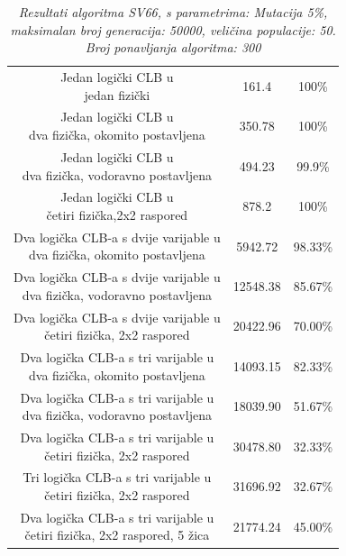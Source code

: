 \documentclass[times, utf8, zavrsni]{fer}
\begin{document}
		
		\begin{table}[htb]
			\caption{\emph{Rezultati algoritma SV66, s parametrima: Mutacija 5\%, maksimalan broj generacija: 50000, veličina populacije: 50. Broj ponavljanja algoritma: 300}}
			\label{gen-alg}
			\centering
			\begin{tabular}{|c | c | c|} \hline
				\thead{Opis} & \thead{Vrijeme u generacijama} & \thead{Uspješnost} \\ \hline
				\makecell{Jedan logički CLB u \\ jedan fizički } & 161.4 & 100\% \\ \hline
				\makecell{Jedan logički CLB u \\ dva fizička, okomito postavljena} & 350.78 & 100\% \\ \hline
				\makecell{Jedan logički CLB u \\ dva fizička, vodoravno postavljena} & 494.23 & 99.9\% \\ \hline
				\makecell{Jedan logički CLB u \\ četiri fizička,2x2 raspored} & 878.2 & 100\% \\ \hline
				\makecell{Dva logička CLB-a s dvije varijable u \\ dva fizička, okomito postavljena} & 5942.72 & 98.33\% \\ \hline
				\makecell{Dva logička CLB-a s dvije varijable u \\ dva fizička, vodoravno postavljena} & 12548.38 & 85.67\% \\ \hline
				\makecell{Dva logička CLB-a s dvije varijable u \\ četiri fizička, 2x2 raspored} & 20422.96 & 70.00\% \\ \hline
				\makecell{Dva logička CLB-a s tri varijable u \\ dva fizička, okomito postavljena} & 14093.15 & 82.33\% \\ \hline
				\makecell{Dva logička CLB-a s tri varijable u \\ dva fizička, vodoravno postavljena} & 18039.90 & 51.67\% \\ \hline
				\makecell{Dva logička CLB-a s tri varijable u \\ četiri fizička, 2x2 raspored} & 30478.80 & 32.33\% \\ \hline
				\makecell{Tri logička CLB-a s tri varijable u \\ četiri fizička, 2x2 raspored} & 31696.92 & 32.67\% \\ \hline
				\makecell{Dva logička CLB-a s tri varijable u \\ četiri fizička, 2x2 raspored, 5 žica} & 21774.24 & 45.00\% \\ \hline
			\end{tabular}
		\end{table}
		
\end{document}
